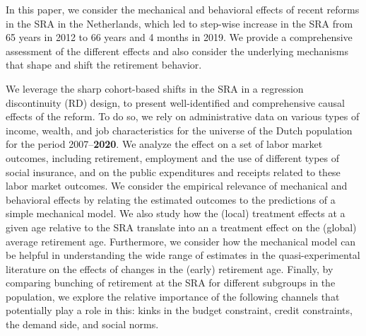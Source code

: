 \documentclass[12pt,a4paper]{article}
\begin{document}
In this paper, we consider the mechanical and behavioral effects of recent reforms in the SRA in the Netherlands, which led to step-wise increase in the SRA from 65 years in 2012 to 66 years and 4 months in 2019. We provide a comprehensive assessment of the different effects and also consider the underlying mechanisms that shape and shift the retirement behavior.

We leverage the sharp cohort-based shifts in the SRA in a regression discontinuity (RD) design, to present well-identified and comprehensive causal effects of the reform. To do so, we rely on administrative data on various types of income, wealth, and job characteristics for the universe of the Dutch population for the period 2007--\textbf{2020}. We analyze the effect on a set of labor market outcomes, including retirement, employment and the use of different types of social insurance, and on the public expenditures and receipts related to these labor market outcomes. We consider the empirical relevance of mechanical and behavioral effects by relating the estimated outcomes to the predictions of a simple mechanical model. We also study how the (local) treatment effects at a given age relative to the SRA translate into an a treatment effect on the (global) average retirement age. Furthermore, we consider how the mechanical model can be helpful in understanding the wide range of estimates in the quasi-experimental literature on the effects of changes in the (early) retirement age. Finally, by comparing bunching of retirement at the SRA for different subgroups in the population, we explore the relative importance of the following channels that potentially play a role in this: kinks in the budget constraint, credit constraints, the demand side, and social norms.

\end{document}
